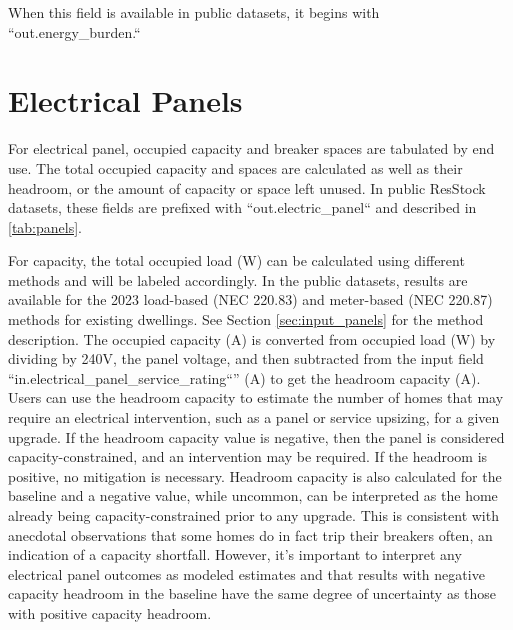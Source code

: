 When this field is available in public datasets, it begins with ``out.energy\_burden.``

\section{Electrical Panels} \label{sec:output_panels}
For electrical panel, occupied capacity and breaker spaces are tabulated by end use. The total occupied capacity and spaces are calculated as well as their headroom, or the amount of capacity or space left unused.  In public ResStock datasets, these fields are prefixed with ``out.electric\_panel`` and described in \ref{tab:panels}. 

For capacity, the total occupied load (W) can be calculated using different methods and will be labeled accordingly. In the public datasets, results are available for the 2023 load-based (NEC 220.83) and meter-based (NEC 220.87) methods for existing dwellings. See Section \ref{sec:input_panels} for the method description. The occupied capacity (A) is converted from occupied load (W) by dividing by 240V, the panel voltage, and then subtracted from the input field ``in.electrical\_panel\_service\_rating``'' (A) to get the headroom capacity (A). Users can use the headroom capacity to estimate the number of homes that may require an electrical intervention, such as a panel or service upsizing, for a given upgrade. If the headroom capacity value is negative, then the panel is considered capacity-constrained, and an intervention may be required. If the headroom is positive, no mitigation is necessary. Headroom capacity is also calculated for the baseline and a negative value, while uncommon, can be interpreted as the home already being capacity-constrained prior to any upgrade. This is consistent with anecdotal observations that some homes do in fact trip their breakers often, an indication of a capacity shortfall. However, it's important to interpret any electrical panel outcomes as modeled estimates and that results with negative capacity headroom in the baseline have the same degree of uncertainty as those with positive capacity headroom.  

